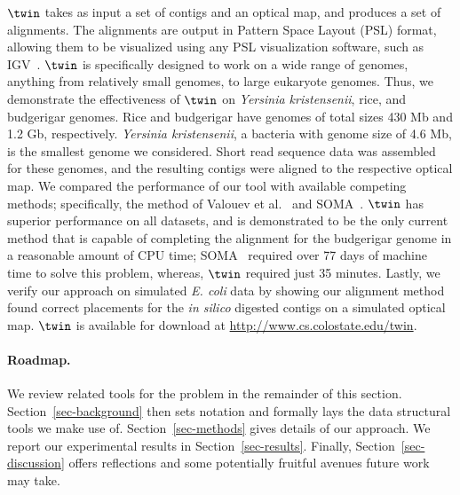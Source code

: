 \documentclass[doctor]{thesis}
\begin{document}
$\twin$ takes as input a set of contigs and an optical map, and produces a set of alignments.  The alignments are output in Pattern Space Layout (PSL) format, allowing them to be visualized using any PSL visualization software, such as IGV~\cite{igv}.  $\twin$ is specifically designed to work on a wide range of genomes, anything from relatively small genomes, to large eukaryote genomes.  Thus, we demonstrate the effectiveness of $\twin$ on {\em Yersinia kristensenii}, rice, and budgerigar genomes.  Rice and budgerigar have genomes of total sizes 430 Mb and 1.2 Gb, respectively. {\em Yersinia kristensenii}, a bacteria with genome size of 4.6 Mb, is the smallest genome we considered.   Short read sequence data was assembled for these genomes, and the resulting contigs were aligned to the respective optical map.   We compared the performance of our tool with available competing methods; specifically, the method of Valouev et al.~\cite{Valouev06} and SOMA~\cite{Nagarajan08}.  $\twin$ has superior performance on all datasets, and is demonstrated to be the only current method that is capable of completing the alignment for the budgerigar genome in a reasonable amount of CPU time; SOMA~\cite{Nagarajan08} required over 77 days of machine time to solve this problem, whereas, $\twin$ required just 35 minutes. Lastly, we verify our approach on simulated {\em E. coli} data by showing our alignment method found correct placements for the {\em in silico} digested contigs on a simulated optical map.     $\twin$ is available for download at \url{http://www.cs.colostate.edu/twin}. 

\paragraph{Roadmap.}
We review related tools for the problem in the remainder of this section. Section~\ref{sec-background} 
then sets notation and formally lays the data structural tools we make use of. 
Section~\ref{sec-methods} gives details of our approach. We report our experimental results in 
Section~\ref{sec-results}. Finally, Section~\ref{sec-discussion} offers reflections and some potentially 
fruitful avenues future work may take.
\end{document}
